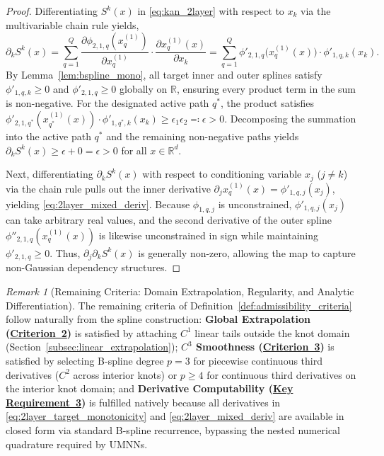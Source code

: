 \documentclass[11pt,a4paper]{article}
\theoremstyle{plain}
\theoremstyle{definition}
\theoremstyle{remark}
\newtheorem{remark}[theorem]{Remark}
\begin{document}
\begin{proof}
Differentiating $S^k(x)$ in \eqref{eq:kan_2layer} with respect to $x_k$ via the multivariable chain rule yields,
\begin{equation}
    \partial_k S^k(x) = \sum_{q=1}^Q \frac{\partial \phi_{2, 1, q}(x^{(1)}_q)}{\partial x^{(1)}_q} \cdot \frac{\partial x^{(1)}_q(x)}{\partial x_k} = \sum_{q=1}^Q \phi'_{2, 1, q}\big(x^{(1)}_q(x)\big) \cdot \phi'_{1, q, k}(x_k).
\end{equation}
By Lemma~\ref{lem:bspline_mono}, all target inner and outer splines satisfy $\phi'_{1, q, k} \ge 0$ and $\phi'_{2, 1, q} \ge 0$ globally on $\mathbb{R}$, ensuring every product term in the sum is non-negative. For the designated active path $q^*$, the product satisfies $\phi'_{2, 1, q^*}(x^{(1)}_{q^*}(x)) \cdot \phi'_{1, q^*, k}(x_k) \ge \epsilon_1 \epsilon_2 \eqqcolon \epsilon > 0$. Decomposing the summation into the active path $q^*$ and the remaining non-negative paths yields $\partial_k S^k(x) \ge \epsilon + 0 = \epsilon > 0$ for all $x \in \mathbb{R}^d$.

Next, differentiating $\partial_k S^k(x)$ with respect to conditioning variable $x_j$ ($j \neq k$) via the chain rule pulls out the inner derivative $\partial_j x^{(1)}_q(x) = \phi'_{1, q, j}(x_j)$, yielding \eqref{eq:2layer_mixed_deriv}. Because $\phi_{1, q, j}$ is unconstrained, $\phi'_{1, q, j}(x_j)$ can take arbitrary real values, and the second derivative of the outer spline $\phi''_{2, 1, q}(x^{(1)}_q(x))$ is likewise unconstrained in sign while maintaining $\phi'_{2, 1, q} \ge 0$. Thus, $\partial_j \partial_k S^k(x)$ is generally non-zero, allowing the map to capture non-Gaussian dependency structures.
\end{proof}

\begin{remark}[Remaining Criteria: Domain Extrapolation, Regularity, and Analytic Differentiation]
\label{rem:remaining_criteria_synthesis}
The remaining criteria of Definition~\ref{def:admissibility_criteria} follow naturally from the spline construction:
\textbf{Global Extrapolation (\hyperref[crit:global_domain]{Criterion~2})} is satisfied by attaching $C^1$ linear tails outside the knot domain (Section~\ref{subsec:linear_extrapolation});
\textbf{$C^3$ Smoothness (\hyperref[crit:c3_smoothness]{Criterion~3})} is satisfied by selecting B-spline degree $p = 3$ for piecewise continuous third derivatives ($C^2$ across interior knots) or $p \ge 4$ for continuous third derivatives on the interior knot domain; and
\textbf{Derivative Computability (\hyperref[req:key_requirement_3]{Key Requirement~3})} is fulfilled natively because all derivatives in \eqref{eq:2layer_target_monotonicity} and \eqref{eq:2layer_mixed_deriv} are available in closed form via standard B-spline recurrence, bypassing the nested numerical quadrature required by UMNNs.
\end{remark}
\end{document}
